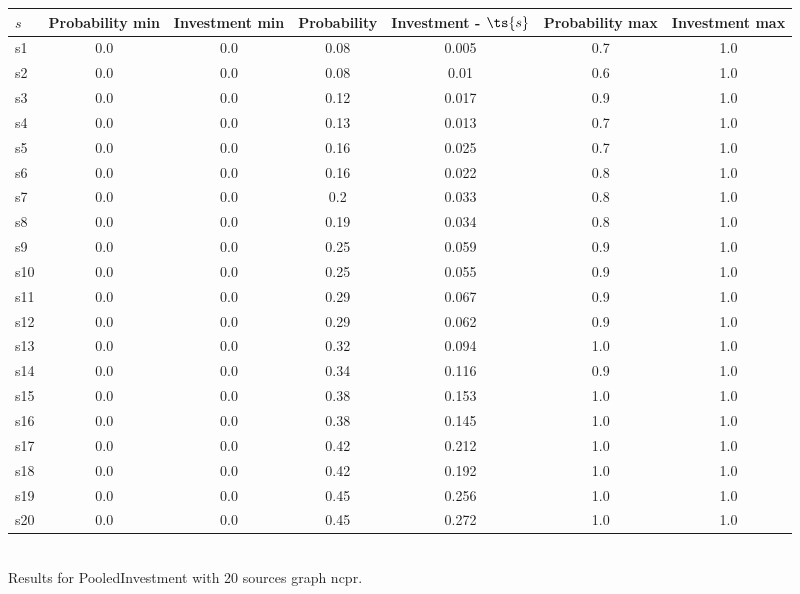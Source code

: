 \documentclass{article}
\begin{document}
\noindent\begin{tabular}{|l|c|c|c|c|c|c|}
\hline
$s$& Probability min & Investment min & Probability & Investment - $\ts{s}$ & Probability max & Investment max\\
\hline
s1 &0.0 & 0.0 & 0.08 & 0.005 & 0.7 & 1.0\\
\hline
s2 &0.0 & 0.0 & 0.08 & 0.01 & 0.6 & 1.0\\
\hline
s3 &0.0 & 0.0 & 0.12 & 0.017 & 0.9 & 1.0\\
\hline
s4 &0.0 & 0.0 & 0.13 & 0.013 & 0.7 & 1.0\\
\hline
s5 &0.0 & 0.0 & 0.16 & 0.025 & 0.7 & 1.0\\
\hline
s6 &0.0 & 0.0 & 0.16 & 0.022 & 0.8 & 1.0\\
\hline
s7 &0.0 & 0.0 & 0.2 & 0.033 & 0.8 & 1.0\\
\hline
s8 &0.0 & 0.0 & 0.19 & 0.034 & 0.8 & 1.0\\
\hline
s9 &0.0 & 0.0 & 0.25 & 0.059 & 0.9 & 1.0\\
\hline
s10 &0.0 & 0.0 & 0.25 & 0.055 & 0.9 & 1.0\\
\hline
s11 &0.0 & 0.0 & 0.29 & 0.067 & 0.9 & 1.0\\
\hline
s12 &0.0 & 0.0 & 0.29 & 0.062 & 0.9 & 1.0\\
\hline
s13 &0.0 & 0.0 & 0.32 & 0.094 & 1.0 & 1.0\\
\hline
s14 &0.0 & 0.0 & 0.34 & 0.116 & 0.9 & 1.0\\
\hline
s15 &0.0 & 0.0 & 0.38 & 0.153 & 1.0 & 1.0\\
\hline
s16 &0.0 & 0.0 & 0.38 & 0.145 & 1.0 & 1.0\\
\hline
s17 &0.0 & 0.0 & 0.42 & 0.212 & 1.0 & 1.0\\
\hline
s18 &0.0 & 0.0 & 0.42 & 0.192 & 1.0 & 1.0\\
\hline
s19 &0.0 & 0.0 & 0.45 & 0.256 & 1.0 & 1.0\\
\hline
s20 &0.0 & 0.0 & 0.45 & 0.272 & 1.0 & 1.0\\
\hline
\end{tabular}\\

\noindent Results for PooledInvestment with 20 sources graph ncpr.
\end{document}
